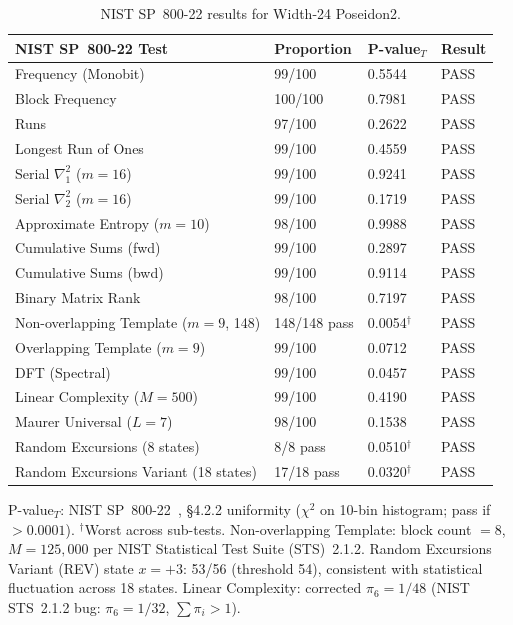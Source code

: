 \documentclass[11pt,a4paper]{article}
\begin{document}
\begin{table}[h]
\centering
\small
\begin{tabular}{@{}llll@{}}
\toprule
NIST SP~800-22 Test & Proportion & P-value$_T$ & Result \\
\midrule
Frequency (Monobit) & 99/100 & 0.5544 & PASS \\
Block Frequency & 100/100 & 0.7981 & PASS \\
Runs & 97/100 & 0.2622 & PASS \\
Longest Run of Ones & 99/100 & 0.4559 & PASS \\
Serial $\nabla^2_1$ ($m = 16$) & 99/100 & 0.9241 & PASS \\
Serial $\nabla^2_2$ ($m = 16$) & 99/100 & 0.1719 & PASS \\
Approximate Entropy ($m = 10$) & 98/100 & 0.9988 & PASS \\
Cumulative Sums (fwd) & 99/100 & 0.2897 & PASS \\
Cumulative Sums (bwd) & 99/100 & 0.9114 & PASS \\
Binary Matrix Rank & 98/100 & 0.7197 & PASS \\
Non-overlapping Template ($m = 9$, 148) & 148/148 pass & 0.0054$^\dagger$ & PASS \\
Overlapping Template ($m = 9$) & 99/100 & 0.0712 & PASS \\
DFT (Spectral) & 99/100 & 0.0457 & PASS \\
Linear Complexity ($M = 500$) & 99/100 & 0.4190 & PASS \\
Maurer Universal ($L = 7$) & 98/100 & 0.1538 & PASS \\
Random Excursions (8 states) & 8/8 pass & 0.0510$^\dagger$ & PASS \\
Random Excursions Variant (18 states) & 17/18 pass & 0.0320$^\dagger$ & PASS \\
\bottomrule
\end{tabular}
\caption{NIST SP~800-22 results for Width-24 Poseidon2.}
\label{tab:nist}
\end{table}

P-value$_T$: NIST SP~800-22~\cite{nist80022}, \S4.2.2 uniformity ($\chi^2$ on 10-bin histogram; pass if $> 0.0001$). $^\dagger$Worst across sub-tests. Non-overlapping Template: block count $= 8$, $M = 125{,}000$ per NIST Statistical Test Suite (STS)~2.1.2. Random Excursions Variant (REV) state $x = +3$: 53/56 (threshold 54), consistent with statistical fluctuation across 18 states. Linear Complexity: corrected $\pi_6 = 1/48$ (NIST STS~2.1.2 bug: $\pi_6 = 1/32$, $\sum \pi_i > 1$).
\end{document}
